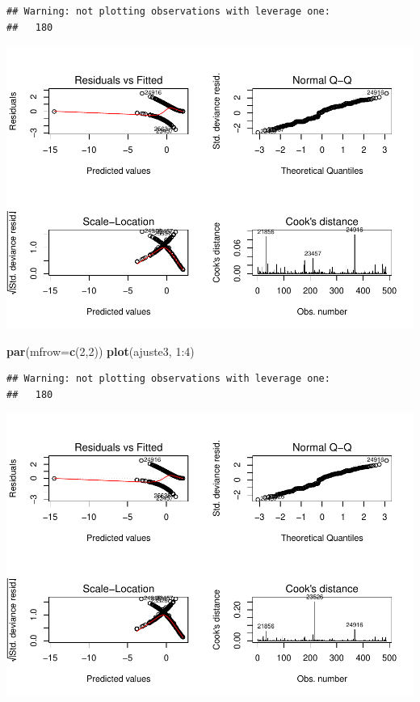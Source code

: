 \documentclass[]{article}
\newenvironment{Shaded}{\begin{snugshade}}{\end{snugshade}}
\newcommand{\KeywordTok}[1]{\textcolor[rgb]{0.13,0.29,0.53}{\textbf{{#1}}}}
\newcommand{\DataTypeTok}[1]{\textcolor[rgb]{0.13,0.29,0.53}{{#1}}}
\newcommand{\DecValTok}[1]{\textcolor[rgb]{0.00,0.00,0.81}{{#1}}}
\newcommand{\NormalTok}[1]{{#1}}
\begin{document}
\begin{verbatim}
## Warning: not plotting observations with leverage one:
##   180
\end{verbatim}

\includegraphics{Dados_Binários1_files/figure-latex/unnamed-chunk-16-1.pdf}

\begin{Shaded}
\begin{Highlighting}[]
\KeywordTok{par}\NormalTok{(}\DataTypeTok{mfrow=}\KeywordTok{c}\NormalTok{(}\DecValTok{2}\NormalTok{,}\DecValTok{2}\NormalTok{))}
\KeywordTok{plot}\NormalTok{(ajuste3, }\DecValTok{1}\NormalTok{:}\DecValTok{4}\NormalTok{)}
\end{Highlighting}
\end{Shaded}

\begin{verbatim}
## Warning: not plotting observations with leverage one:
##   180
\end{verbatim}

\includegraphics{Dados_Binários1_files/figure-latex/unnamed-chunk-16-2.pdf}
\end{document}
